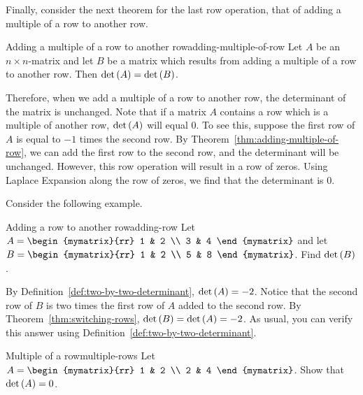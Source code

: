 Finally, consider the next theorem for the last row operation, that of adding a multiple of a row
to another row. 

\begin{theorem}{Adding a multiple of a row to another row}{adding-multiple-of-row}
Let $A$ be an $n\times n$-matrix and let $B$ be a matrix
which results from adding a multiple of a row to another row.
 Then $\det \left(A\right) =\det
\left(B\right)$.
\end{theorem}

Therefore, when we add a multiple of a row to another row, the determinant of the matrix is unchanged. 
Note that if a matrix $A$ contains a row which is a multiple of another row, $\det \left(A\right)$ will equal $0$. To see this,
suppose the first row of $A$ is equal to $-1$ times the second row. By Theorem~\ref{thm:adding-multiple-of-row}, we can 
add the first row to the second row, and the determinant will be unchanged. However, this row operation will result in a row of zeros.
Using Laplace Expansion along the row of zeros, we find that the determinant is $0$. 

Consider the following example.

\begin{example}{Adding a row to another row}{adding-row}
Let $A=\begin{mymatrix}{rr}
1 & 2 \\
3 & 4
\end{mymatrix} $ and let $B=\begin{mymatrix}{rr}
1 & 2 \\
5 & 8
\end{mymatrix}$. 
Find $\det \left(B\right)$.
\end{example}

\begin{solution}
By Definition~\ref{def:two-by-two-determinant}, $\det \left(A\right) = -2$. 
Notice that the second row of $B$ is two times the first row of $A$ added
to the second row. 
By Theorem~\ref{thm:switching-rows}, $\det \left(B\right) = \det \left(A \right)
=-2$.
As usual, you can verify this answer using Definition~\ref{def:two-by-two-determinant}.
\end{solution}

\begin{example}{Multiple of a row}{multiple-rows}
Let $A = \begin{mymatrix}{rr}
1 & 2 \\
2 & 4 
\end{mymatrix}$. Show that $\det \left(A \right) = 0$. 
\end{example}

